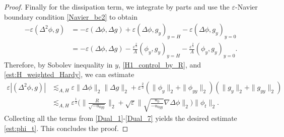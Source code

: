 \documentclass[10pt,a4paper]{amsart}
\begin{document}
\begin{proof}
Finally for the dissipation term, we integrate by parts and use the $\varepsilon$-Navier boundary condition \eqref{Navier_bc2} to obtain
\begin{equation*}
\begin{aligned}
-\varepsilon(\Delta^2 \phi, g) &= - \varepsilon (\Delta \phi, \Delta g) + \varepsilon (\Delta \phi, g_y)_{y = H} - \varepsilon (\Delta \phi, g_y)_{y = 0}\\
&= - \varepsilon (\Delta \phi, \Delta g) - \frac{\varepsilon^{\frac{2}{3}}}{A} ( \phi_y, g_y)_{y = H} - \frac{\varepsilon^{\frac{2}{3}}}{A} ( \phi_y, g_y)_{y = 0}.
\end{aligned}
\end{equation*}
Therefore, by Sobolev inequality in $y$, \eqref{H1_control_by_R}, and \eqref{est:H_weighted_Hardy}, we can estimate
\begin{equation}\label{Dual_7}
\begin{aligned}
\varepsilon|(\Delta^2 \phi, g)| &\lesssim_{A,H} \varepsilon \| \Delta\phi\|_2\|\Delta g\|_2 + \varepsilon^{\frac{2}{3}} (\| \phi_y\|_2 + \| \phi_{yy}\|_2) (\|g_y\|_2 + \| g_{yy}\|_2)\\
&\lesssim_{A,H} \varepsilon^{\frac{1}{3}}  \Big( \|\frac{R}{\sqrt{-u_{0yy}}}\|_2 + \sqrt{\varepsilon} \| \sqrt{\frac{u_0}{-u_{0yy}}} \nabla \Delta \phi\|_2\Big) \|\phi_t\|_2.
\end{aligned}
\end{equation}
Collecting all the terms from \eqref{Dual_1}-\eqref{Dual_7} yields the desired estimate \eqref{est:phi_t}. This concludes the proof.
\end{proof}
\end{document}
